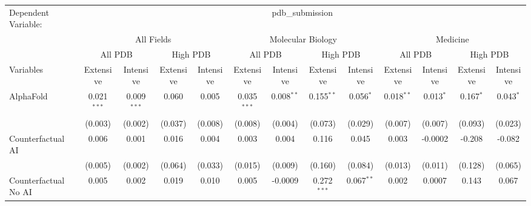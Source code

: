 \begingroup
\centering
\begin{tabular}{lcccccccccccc}
   \tabularnewline \midrule \midrule
   Dependent Variable: & \multicolumn{12}{c}{pdb\_submission}\\
 & \multicolumn{4}{c}{All Fields} & \multicolumn{4}{c}{Molecular Biology} & \multicolumn{4}{c}{Medicine} \\
\cmidrule(lr){2-5} \cmidrule(lr){6-9} \cmidrule(lr){10-13}
 & \multicolumn{2}{c}{All PDB} & \multicolumn{2}{c}{High PDB} & \multicolumn{2}{c}{All PDB} & \multicolumn{2}{c}{High PDB} & \multicolumn{2}{c}{All PDB} & \multicolumn{2}{c}{High PDB} \\
\cmidrule(lr){2-3} \cmidrule(lr){4-5} \cmidrule(lr){6-7} \cmidrule(lr){8-9} \cmidrule(lr){10-11} \cmidrule(lr){12-13}
Variables & \multicolumn{1}{c}{Extensive} & \multicolumn{1}{c}{Intensive} & \multicolumn{1}{c}{Extensive} & \multicolumn{1}{c}{Intensive} & \multicolumn{1}{c}{Extensive} & \multicolumn{1}{c}{Intensive} & \multicolumn{1}{c}{Extensive} & \multicolumn{1}{c}{Intensive} & \multicolumn{1}{c}{Extensive} & \multicolumn{1}{c}{Intensive} & \multicolumn{1}{c}{Extensive} & \multicolumn{1}{c}{Intensive} \\
\cmidrule(lr){1-1}\cmidrule(lr){2-2} \cmidrule(lr){3-3} \cmidrule(lr){4-4} \cmidrule(lr){5-5} \cmidrule(lr){6-6} \cmidrule(lr){7-7} \cmidrule(lr){8-8} \cmidrule(lr){9-9} \cmidrule(lr){10-10} \cmidrule(lr){11-11} \cmidrule(lr){12-12} \cmidrule(lr){13-13}
   AlphaFold                                & 0.021$^{***}$  & 0.009$^{***}$  & 0.060        & 0.005   & 0.035$^{***}$  & 0.008$^{**}$  & 0.155$^{**}$   & 0.056$^{*}$    & 0.018$^{**}$  & 0.013$^{*}$ & 0.167$^{*}$   & 0.043$^{*}$\\   
                                            & (0.003)        & (0.002)        & (0.037)      & (0.008) & (0.008)        & (0.004)       & (0.073)        & (0.029)        & (0.007)       & (0.007)     & (0.093)       & (0.023)\\   
   Counterfactual AI                        & 0.006          & 0.001          & 0.016        & 0.004   & 0.003          & 0.004         & 0.116          & 0.045          & 0.003         & -0.0002     & -0.208        & -0.082\\   
                                            & (0.005)        & (0.002)        & (0.064)      & (0.033) & (0.015)        & (0.009)       & (0.160)        & (0.084)        & (0.013)       & (0.011)     & (0.128)       & (0.065)\\   
   Counterfactual No AI                     & 0.005          & 0.002          & 0.019        & 0.010   & 0.005          & -0.0009       & 0.272$^{***}$  & 0.067$^{**}$   & 0.002         & 0.0007      & 0.143         & 0.067\\   

\end{tabular}
